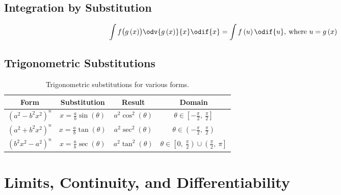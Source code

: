 \documentclass{article}
\begin{document}
\subsection{Integration by Substitution}
\begin{theorem}
    \begin{equation*}
        \int f\bigl(g\left( x \right)\bigr)\odv{g\left( x \right)}{x} \odif{x} = \int f\left( u \right) \odif{u}, \: \text{where } u = g\left( x \right)
    \end{equation*}
\end{theorem}
\subsection{Trigonometric Substitutions}
\begin{table}[H]
    \renewcommand*{\arraystretch}{1.5}
    \centering
    \begin{tabular}{c c c c}
        \toprule
        \textbf{Form}                 & \textbf{Substitution}                                      & \textbf{Result}                      & \textbf{Domain}                                                                        \\
        \midrule
        \(\left(a^2-b^2x^2\right)^n\) & \(\displaystyle x=\frac{a}{b}\sin{\left( \theta \right)}\) & \(a^2\cos^2{\left( \theta \right)}\) & \(\theta\in \left[ -\frac{\pi}{2},\: \frac{\pi}{2} \right]\)                           \\[8pt]
        \(\left(a^2+b^2x^2\right)^n\) & \(\displaystyle x=\frac{a}{b}\tan{\left( \theta \right)}\) & \(a^2\sec^2{\left( \theta \right)}\) & \(\theta\in \left( -\frac{\pi}{2},\: \frac{\pi}{2} \right)\)                           \\[8pt]
        \(\left(b^2x^2-a^2\right)^n\) & \(\displaystyle x=\frac{a}{b}\sec{\left( \theta \right)}\) & \(a^2\tan^2{\left( \theta \right)}\) & \(\theta\in \left[ 0,\: \frac{\pi}{2} \right) \cup \left(\frac{\pi}{2},\: \pi\right]\) \\
        \bottomrule
    \end{tabular}
    \caption{Trigonometric substitutions for various forms.}
\end{table}
\newpage
\section{Limits, Continuity, and Differentiability}
\end{document}
